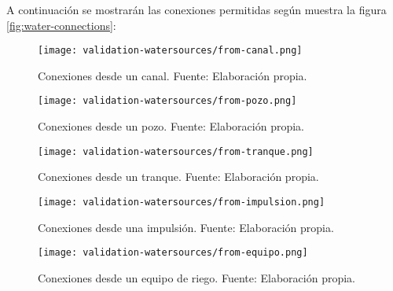 A continuación se mostrarán las conexiones permitidas según muestra la figura \ref{fig:water-connections}:

\begin{figure}[H]
	\centering
	\texttt{[image: validation-watersources/from-canal.png]}
	\caption{\label{fig:from-canal} Conexiones desde un canal. Fuente: Elaboración propia.}
\end{figure}

\begin{figure}[H]
	\centering
	\texttt{[image: validation-watersources/from-pozo.png]}
	\caption{\label{fig:from-pozo} Conexiones desde un pozo. Fuente: Elaboración propia.}
\end{figure}

\begin{figure}[H]
	\centering
	\texttt{[image: validation-watersources/from-tranque.png]}
	\caption{\label{fig:from-tranque} Conexiones desde un tranque. Fuente: Elaboración propia.}
\end{figure}

\begin{figure}[H]
	\centering
	\texttt{[image: validation-watersources/from-impulsion.png]}
	\caption{\label{fig:from-impulsion} Conexiones desde una impulsión. Fuente: Elaboración propia.}
\end{figure}

\begin{figure}[H]
	\centering
	\texttt{[image: validation-watersources/from-equipo.png]}
	\caption{\label{fig:from-equipo} Conexiones desde un equipo de riego. Fuente: Elaboración propia.}
\end{figure}